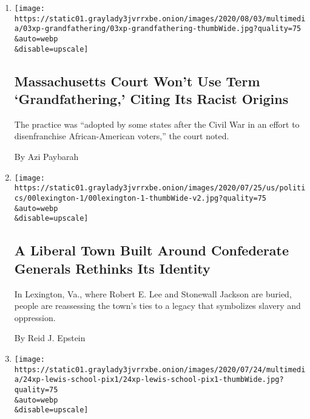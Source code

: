 \begin{enumerate}
\def\labelenumi{\arabic{enumi}.}
\item
  \href{/2020/08/03/us/racism-massachusetts-grandfathering.html}{}

  \texttt{[image: https://static01.graylady3jvrrxbe.onion/images/2020/08/03/multimedia/03xp-grandfathering/03xp-grandfathering-thumbWide.jpg?quality=75\\\&auto=webp\\\&disable=upscale]}

  \hypertarget{massachusetts-court-wont-use-term-grandfathering-citing-its-racist-origins}{%
  \subsection{Massachusetts Court Won't Use Term `Grandfathering,'
  Citing Its Racist
  Origins}\label{massachusetts-court-wont-use-term-grandfathering-citing-its-racist-origins}}

  The practice was ``adopted by some states after the Civil War in an
  effort to disenfranchise African-American voters,'' the court noted.

  By Azi Paybarah
\item
  \href{/2020/07/26/us/politics/lexington-va-confederate-generals.html}{}

  \texttt{[image: https://static01.graylady3jvrrxbe.onion/images/2020/07/25/us/politics/00lexington-1/00lexington-1-thumbWide-v2.jpg?quality=75\\\&auto=webp\\\&disable=upscale]}

  \hypertarget{a-liberal-town-built-around-confederate-generals-rethinks-its-identity}{%
  \subsection{A Liberal Town Built Around Confederate Generals Rethinks
  Its
  Identity}\label{a-liberal-town-built-around-confederate-generals-rethinks-its-identity}}

  In Lexington, Va., where Robert E. Lee and Stonewall Jackson are
  buried, people are reassessing the town's ties to a legacy that
  symbolizes slavery and oppression.

  By Reid J. Epstein
\item
  \href{/2020/07/24/us/robert-e-lee-high-school-john-lewis.html}{}

  \texttt{[image: https://static01.graylady3jvrrxbe.onion/images/2020/07/24/multimedia/24xp-lewis-school-pix1/24xp-lewis-school-pix1-thumbWide.jpg?quality=75\\\&auto=webp\\\&disable=upscale]}

  \hypertarget{robert-e-lee-high-in-virginia-will-be-renamed-for-john-lewis-district-says}{%
}
\end{enumerate}
